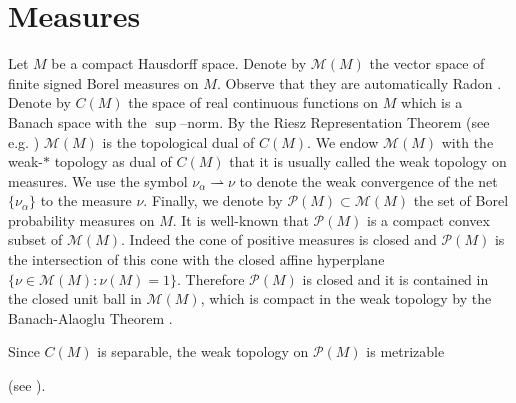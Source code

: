 \documentclass[leqno,11pt, a4]{amsart}
\theoremstyle{named}
\begin{document}
\section{Measures}
\label{sez-misure}
Let $M$ be a compact Hausdorff space. Denote by ${\mathscr{M}}(M)$ the vector space
of finite signed Borel measures on $M$.  Observe that they are automatically
Radon \cite[Thm. 7.8, p. 217]{folland-real-analysis}.  Denote by
$C(M)$ the space of real continuous functions on $M$ which is a Banach
space with the $\sup$--norm. By the Riesz Representation Theorem
(see e.g. \cite[p.223]{folland-real-analysis}) ${\mathscr{M}}(M)$ is the
topological dual of $C(M)$.
  We endow ${\mathscr{M}}(M)$ with the weak-$*$ topology as dual of $C(M)$ that it is
  usually called the weak topology on measures. We use
  the symbol $\nu_{\alpha} {\rightharpoonup} \nu$ to denote the weak convergence of
  the net $\{\nu_{\alpha}\}$ to the measure $\nu$.  Finally, we denote by
  ${\mathscr{P}}(M) \subset {\mathscr{M}}(M)$ the set of Borel probability measures
  on $M$.  It is well-known that ${{\mathscr{P}}(M)}$ is a compact convex subset of
  ${\mathscr{M}}(M)$. Indeed the cone of positive measures is closed and
  ${\mathscr{P}}(M)$ is the intersection of this cone with the closed affine
  hyperplane $\{\nu\in {\mathscr{M}}(M) : \nu(M) = 1\}$. Therefore ${\mathscr{P}}(M)$ is
  closed and  it is
  contained in the closed unit ball in ${\mathscr{M}}(M)$, which is compact in
  the weak topology by the Banach-Alaoglu Theorem
  \cite[p. 425]{dunford-schwartz-1}.
  
  Since $C(M)$ is separable, the weak topology on ${{\mathscr{P}}(M)}$ is metrizable
  
 (see  \cite [p. 426]{dunford-schwartz-1}).
  
  
\end{document}
